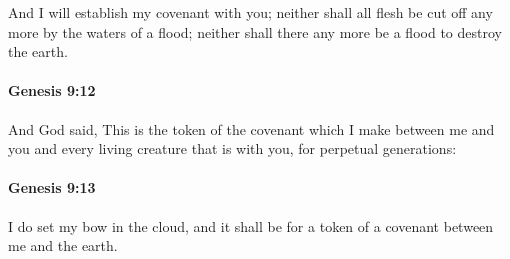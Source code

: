 			And I will establish my covenant with you; neither shall all flesh be cut off any more by the waters of a flood; neither shall there any more be a flood to destroy the earth.


		\paragraph{Genesis 9:12} %
			\label{GENESIS-9-12}

			And God said, This is the token of the covenant which I make between me and you and every living creature that is with you, for perpetual generations:


		\paragraph{Genesis 9:13} %
			\label{GENESIS-9-13}

			I do set my bow in the cloud, and it shall be for a token of a covenant between me and the earth.


